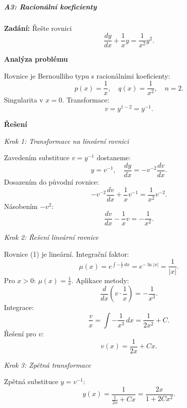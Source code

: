 \vspace{2\baselineskip}

\subparagraph*{A3: Racionální koeficienty}
\label{subpar:a3-racionalni-koeficienty}

\begin{example}
\label{ex:a3-lehky-racionalni}

\noindent\textbf{Zadání:} Řešte rovnici
\[
\frac{dy}{dx} + \frac{1}{x}y = \frac{1}{x^2} y^2.
\]

\vspace{1.5\baselineskip}

\noindent\textbf{Analýza problému}

\noindent Rovnice je Bernoulliho typu s racionálními koeficienty:
\[
p(x) = \frac{1}{x}, \quad q(x) = \frac{1}{x^2}, \quad n = 2.
\]
Singularita v $x = 0$. Transformace:
\[
v = y^{1-2} = y^{-1}.
\]

\vspace{1.5\baselineskip}

\noindent\textbf{Řešení}

\noindent\textit{Krok 1: Transformace na lineární rovnici}

Zavedením substituce $v = y^{-1}$ dostaneme:
\[
y = v^{-1}, \quad \frac{dy}{dx} = -v^{-2}\frac{dv}{dx}.
\]
Dosazením do původní rovnice:
\[
-v^{-2}\frac{dv}{dx} + \frac{1}{x}v^{-1} = \frac{1}{x^2} v^{-2}.
\]
Násobením $-v^2$:
\[
\frac{dv}{dx} - \frac{1}{x}v = -\frac{1}{x^2}. \tag{1}
\]

\vspace{1\baselineskip}

\noindent\textit{Krok 2: Řešení lineární rovnice}

Rovnice (1) je lineární. Integrační faktor:
\[
\mu(x) = e^{\int -\frac{1}{x}\,dx} = e^{-\ln|x|} = \frac{1}{|x|}.
\]
Pro $x > 0$: $\mu(x) = \frac{1}{x}$. Aplikace metody:
\[
\frac{d}{dx}\left(v \cdot \frac{1}{x}\right) = -\frac{1}{x^3}.
\]
Integrace:
\[
\frac{v}{x} = \int -\frac{1}{x^3}\,dx = \frac{1}{2x^2} + C.
\]
Řešení pro $v$:
\[
v(x) = \frac{1}{2x} + Cx. \tag{2}
\]

\vspace{1\baselineskip}

\noindent\textit{Krok 3: Zpětná transformace}

Zpětná substituce $y = v^{-1}$:
\[
y(x) = \frac{1}{\frac{1}{2x} + Cx} = \frac{2x}{1 + 2Cx^2}. \tag{3}
\]

\vspace{1.5\baselineskip}


\end{example}
